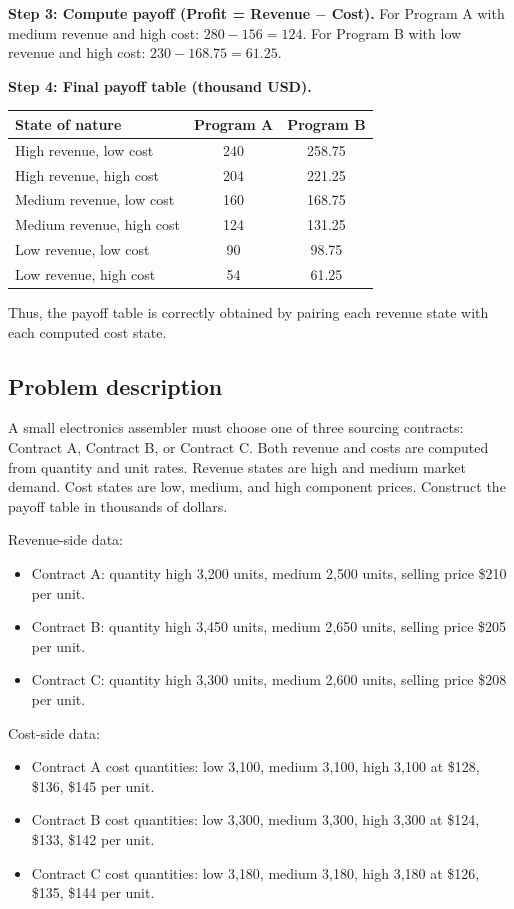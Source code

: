\begin{ExamProblems}
		\textbf{Step 3: Compute payoff (Profit = Revenue $-$ Cost).}
		For Program A with medium revenue and high cost: \(280-156=124\).
		For Program B with low revenue and high cost: \(230-168.75=61.25\).
		
		\textbf{Step 4: Final payoff table (thousand USD).}
		\begin{center}
			\begin{tabular}{l c c}
				\toprule
				State of nature & Program A & Program B \\
				\midrule
				High revenue, low cost & 240 & 258.75 \\
				High revenue, high cost & 204 & 221.25 \\
				Medium revenue, low cost & 160 & 168.75 \\
				Medium revenue, high cost & 124 & 131.25 \\
				Low revenue, low cost & 90 & 98.75 \\
				Low revenue, high cost & 54 & 61.25 \\
				\bottomrule
			\end{tabular}
		\end{center}
		
		Thus, the payoff table is correctly obtained by pairing each revenue state with each computed cost state.
		
		\item
		\subsection*{Problem description}
		A small electronics assembler must choose one of three sourcing contracts: Contract A, Contract B, or Contract C.
		Both revenue and costs are computed from quantity and unit rates.
		Revenue states are high and medium market demand. Cost states are low, medium, and high component prices.
		Construct the payoff table in thousands of dollars.
		
		Revenue-side data:
		\begin{itemize}
			\item Contract A: quantity high 3{,}200 units, medium 2{,}500 units, selling price \$210 per unit.
			\item Contract B: quantity high 3{,}450 units, medium 2{,}650 units, selling price \$205 per unit.
			\item Contract C: quantity high 3{,}300 units, medium 2{,}600 units, selling price \$208 per unit.
		\end{itemize}
		Cost-side data:
		\begin{itemize}
			\item Contract A cost quantities: low 3{,}100, medium 3{,}100, high 3{,}100 at \$128, \$136, \$145 per unit.
			\item Contract B cost quantities: low 3{,}300, medium 3{,}300, high 3{,}300 at \$124, \$133, \$142 per unit.
			\item Contract C cost quantities: low 3{,}180, medium 3{,}180, high 3{,}180 at \$126, \$135, \$144 per unit.
		\end{itemize}
		

\end{ExamProblems}
